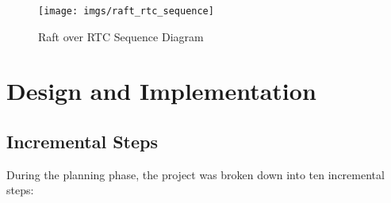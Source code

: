\documentclass[conference,compsoc]{./IEEEtran/IEEEtran}
\begin{document}
\begin{figure}[!t]
\centerline{\texttt{[image: imgs/raft\_rtc\_sequence]}}
\caption{Raft over RTC Sequence Diagram}
  \label{fig:raft_rtc_sequence}
\end{figure}

\section {Design and Implementation}


\ifdefined\OPTIONAL

\subsection{Incremental Steps}

During the planning phase, the project was broken down into ten incremental steps:
\end{document}

